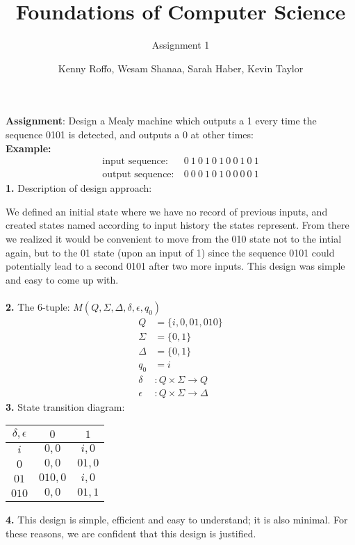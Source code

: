 \documentclass{scrartcl}
\title{Foundations of Computer Science}
\subtitle{Assignment 1}
\author{Kenny Roffo, Wesam Shanaa, Sarah Haber, Kevin Taylor}
\begin{document}
\maketitle

\textbf{Assignment}: Design a Mealy machine which outputs a 1 every time the sequence 0101 is detected, and outputs a 0 at other times:\\
\textbf{Example:}
\begin{align*}
\text{input sequence:}&\ 0\ 1\ 0\ 1\ 0\ 1\ 0\ 0\ 1\ 0\ 1\\
\text{output sequence:}&\ 0\ 0\ 0\ 1\ 0\ 1\ 0\ 0\ 0\ 0\ 1
\end{align*}
\textbf{1.} Description of design approach:

We defined an initial state where we have no record of previous inputs, and created states named according to input history the states represent. From there we realized it would be convenient to move from the 010 state not to the intial again, but to the 01 state (upon an input of 1) since the sequence 0101 could potentially lead to a second 0101 after two more inputs. This design was simple and easy to come up with.\\
\\
\textbf{2.} The 6-tuple: $M(Q,\Sigma,\Delta,\delta,\epsilon,q_0)$
\begin{align*}
Q&=\{i,0,01,010\}\\
\Sigma&=\{0,1\}\\
\Delta&=\{0,1\}\\
q_0&=i\\
\delta&:Q \times \Sigma \rightarrow Q\\
\epsilon&: Q \times \Sigma \rightarrow \Delta
\end{align*}
\textbf{3.} State transition diagram:
\begin{center}
\begin{tabular} {|c|c c|}
\hline
$\delta,\epsilon$&$0$&$1$\\
\hline
$i$&$0,0$&$i,0$\\
$0$&$0,0$&$01,0$\\
$01$&$010,0$&$i,0$\\
$010$&$0,0$&$01,1$\\
\hline
\end{tabular}
\end{center}
\textbf{4.} This design is simple, efficient and easy to understand; it is also minimal. For these reasons, we are confident that this design is justified.
\end{document}
